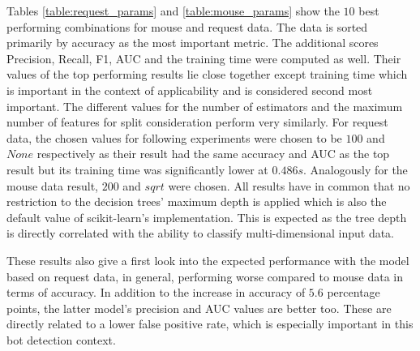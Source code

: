 \documentclass[
    fontsize=12pt,
    headings=small,
    parskip=half,           %
    bibliography=totoc,
    numbers=noenddot,       %
    open=any,               %
    final,                   %
    table
]{scrreprt}
\begin{document}
Tables \ref{table:request_params} and \ref{table:mouse_params} show the $10$ best performing combinations for mouse  and request data. The data is sorted primarily by accuracy as the most important metric. The additional scores Precision, Recall, F1, AUC and the training time were computed as well. Their values of the top performing results lie close together except training time which is important in the context of applicability and is considered second most important. The different values for the number of estimators and the maximum number of features for split consideration perform very similarly. For request data, the chosen values for following experiments were chosen to be $100$ and $None$ respectively as their result had the same accuracy and AUC as the top result but its training time was significantly lower at $0.486s$. Analogously for the mouse data result, $200$ and $sqrt$ were chosen. All results have in common that no restriction to the decision trees' maximum depth is applied which is also the default value of scikit-learn's implementation. This is expected as the tree depth is directly correlated with the ability to classify multi-dimensional input data.

These results also give a first look into the expected performance with the model based on request data, in general, performing worse compared to mouse data in terms of accuracy. In addition to the increase in accuracy of $5.6$ percentage points, the latter model's precision and AUC values are better too. These are directly related to a lower false positive rate, which is especially important in this bot detection context.
\end{document}
